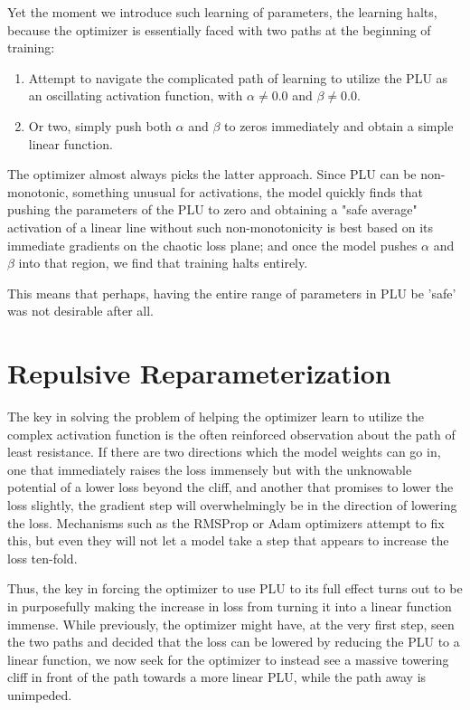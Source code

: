 \documentclass[11pt, letterpaper]{article}
\begin{document}
Yet the moment we introduce such learning of parameters, the learning halts, because the optimizer is essentially faced with two paths at the beginning of training:
\begin{enumerate}
    \item Attempt to navigate the complicated path of learning to utilize the PLU as an oscillating activation function, with $\alpha \neq 0.0$ and $\beta \neq 0.0$.
    \item Or two, simply push both $\alpha$ and $\beta$ to zeros immediately and obtain a simple linear function.
\end{enumerate}
The optimizer almost always picks the latter approach. Since PLU can be non-monotonic, something unusual for activations, the model quickly finds that pushing the parameters of the PLU to zero and obtaining a "safe average" activation of a linear line without such non-monotonicity is best based on its immediate gradients on the chaotic loss plane; and once the model pushes $\alpha$ and $\beta$ into that region, we find that training halts entirely.

This means that perhaps, having the entire range of parameters in PLU be 'safe' was not desirable after all.

\section{Repulsive Reparameterization}

The key in solving the problem of helping the optimizer learn to utilize the complex activation function is the often reinforced observation about the path of least resistance. If there are two directions which the model weights can go in, one that immediately raises the loss immensely but with the unknowable potential of a lower loss beyond the cliff, and another that promises to lower the loss slightly, the gradient step will overwhelmingly be in the direction of lowering the loss. Mechanisms such as the RMSProp \cite{hintonetalrmsprop} or Adam \cite{kingma2017adammethodstochasticoptimization} optimizers attempt to fix this, but even they will not let a model take a step that appears to increase the loss ten-fold.

Thus, the key in forcing the optimizer to use PLU to its full effect turns out to be in purposefully making the increase in loss from turning it into a linear function immense. While previously, the optimizer might have, at the very first step, seen the two paths and decided that the loss can be lowered by reducing the PLU to a linear function, we now seek for the optimizer to instead see a massive towering cliff in front of the path towards a more linear PLU, while the path away is unimpeded.
\end{document}
